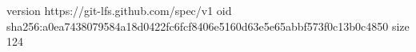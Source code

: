 version https://git-lfs.github.com/spec/v1
oid sha256:a0ea7438079584a18d0422fc6fcf8406e5160d63e5e65abbf573f0c13b0c4850
size 124
